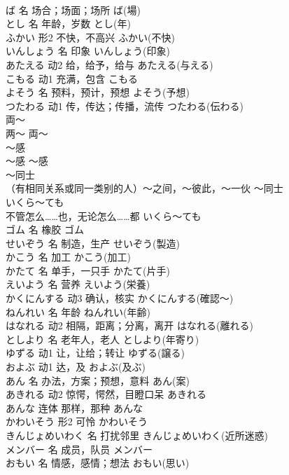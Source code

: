 \documentclass[8pt]{extreport}
\begin{document}
\begin{CJK}{UTF8}{min}
\\	ば	名	场合；场面；场所	ば(場)	
\\	とし	名	年龄，岁数	とし(年)	
\\	ふかい	形2	不快，不高兴	ふかい(不快)	
\\	いんしょう	名	印象	いんしょう(印象)	
\\	あたえる	动2	给，给予，给与	あたえる(与える)	
\\	こもる	动1	充满，包含	こもる	
\\	よそう	名	预料，预计，预想	よそう(予想)	
\\	つたわる	动1	传，传达；传播，流传	つたわる(伝わる)	
\\	両～	
\\	两～	両～	
\\	～感	
\\	～感	～感	
\\	～同士	
\\	（有相同关系或同一类别的人）～之间，～彼此，～一伙	～同士	
\\	いくら～ても	
\\	不管怎么……也，无论怎么……都	いくら～ても	
\\	ゴム	名	橡胶	ゴム	
\\	せいぞう	名	制造，生产	せいぞう(製造)	
\\	かこう	名	加工	かこう(加工)	
\\	かたて	名	单手，一只手	かたて(片手)	
\\	えいよう	名	营养	えいよう(栄養)	
\\	かくにんする	动3	确认，核实	かくにんする(確認～)	
\\	ねんれい	名	年龄	ねんれい(年齢)	
\\	はなれる	动2	相隔，距离；分离，离开	はなれる(離れる)	
\\	としより	名	老年人，老人	としより(年寄り)	
\\	ゆずる	动1	让，让给；转让	ゆずる(譲る)	
\\	およぶ	动1	达，及	およぶ(及ぶ)	
\\	あん	名	办法，方案；预想，意料	あん(案)	
\\	あきれる	动2	惊愕，愕然，目瞪口呆	あきれる	
\\	あんな	连体	那样，那种	あんな	
\\	かわいそう	形2	可怜	かわいそう	
\\	きんじょめいわく	名	打扰邻里	きんじょめいわく(近所迷惑)	
\\	メンバー	名	成员，队员	メンバー	
\\	おもい	名	情感，感情；想法	おもい(思い)	

\end{CJK}
\end{document}
